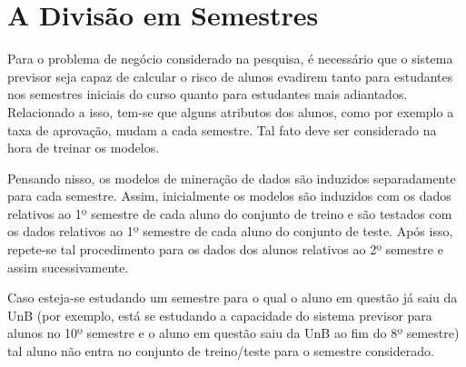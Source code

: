 
\section{A Divisão em Semestres}
Para o problema de negócio considerado na pesquisa, é necessário que o sistema
previsor seja capaz de calcular o risco de alunos evadirem tanto para estudantes nos
semestres iniciais do curso quanto para estudantes mais adiantados. Relacionado a
isso, tem-se que alguns atributos dos alunos, como por exemplo a taxa de aprovação,
mudam a cada semestre. Tal fato deve ser considerado na hora de treinar os modelos. 
\par Pensando nisso, os modelos de mineração de dados são induzidos
separadamente para cada semestre. Assim, inicialmente os modelos são induzidos com os
dados relativos ao 1º semestre de cada aluno do conjunto de treino e são
testados com os dados relativos ao 1º semestre de cada aluno do conjunto de
teste. Após isso, repete-se tal procedimento para os dados dos alunos relativos ao
2º semestre e assim sucessivamente. 
\par Caso esteja-se estudando um semestre para o
qual o aluno em questão já saiu da UnB (por exemplo, está se estudando a capacidade
do sistema previsor para alunos no 10º semestre e o aluno em questão saiu da UnB ao
fim do 8º semestre) tal aluno não entra no conjunto de treino/teste para o semestre
considerado.   

